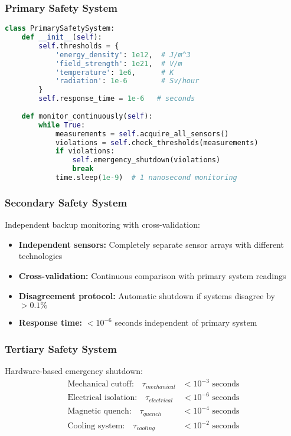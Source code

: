 \documentclass[11pt]{article}
\begin{document}
\subsubsection{Primary Safety System}
\begin{lstlisting}[language=Python, caption=Primary Safety Monitor Implementation]
class PrimarySafetySystem:
    def __init__(self):
        self.thresholds = {
            'energy_density': 1e12,  # J/m^3
            'field_strength': 1e21,  # V/m  
            'temperature': 1e6,      # K
            'radiation': 1e-6        # Sv/hour
        }
        self.response_time = 1e-6   # seconds
        
    def monitor_continuously(self):
        while True:
            measurements = self.acquire_all_sensors()
            violations = self.check_thresholds(measurements)
            if violations:
                self.emergency_shutdown(violations)
                break
            time.sleep(1e-9)  # 1 nanosecond monitoring
\end{lstlisting}

\subsubsection{Secondary Safety System}
Independent backup monitoring with cross-validation:
\begin{itemize}
\item \textbf{Independent sensors:} Completely separate sensor arrays with different technologies
\item \textbf{Cross-validation:} Continuous comparison with primary system readings
\item \textbf{Disagreement protocol:} Automatic shutdown if systems disagree by $>0.1\%$
\item \textbf{Response time:} $< 10^{-6}$ seconds independent of primary system
\end{itemize}

\subsubsection{Tertiary Safety System}
Hardware-based emergency shutdown:
\begin{align}
\text{Mechanical cutoff:} \quad \tau_{mechanical} &< 10^{-3} \text{ seconds} \\
\text{Electrical isolation:} \quad \tau_{electrical} &< 10^{-6} \text{ seconds} \\
\text{Magnetic quench:} \quad \tau_{quench} &< 10^{-4} \text{ seconds} \\
\text{Cooling system:} \quad \tau_{cooling} &< 10^{-2} \text{ seconds}
\end{align}
\end{document}
